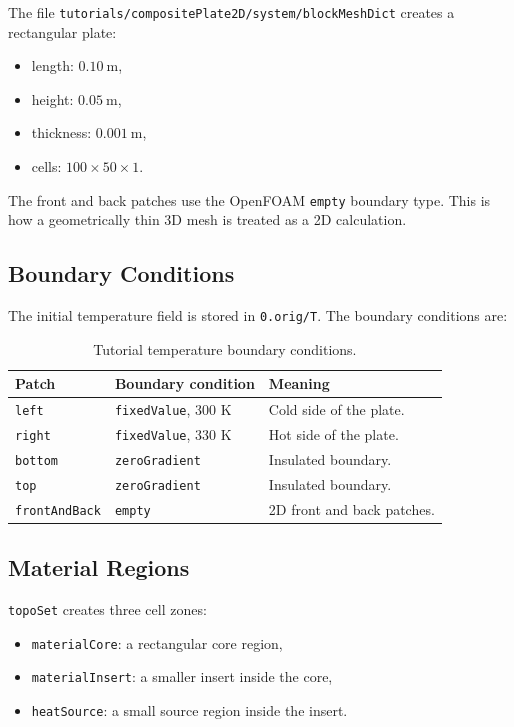 \documentclass[11pt,a4paper]{article}
\newcommand{\code}[1]{\texttt{#1}}
\begin{document}
The file \code{tutorials/compositePlate2D/system/blockMeshDict} creates a
rectangular plate:

\begin{itemize}
    \item length: $0.10~\mathrm{m}$,
    \item height: $0.05~\mathrm{m}$,
    \item thickness: $0.001~\mathrm{m}$,
    \item cells: $100 \times 50 \times 1$.
\end{itemize}

The front and back patches use the OpenFOAM \code{empty} boundary type. This is
how a geometrically thin 3D mesh is treated as a 2D calculation.

\subsection{Boundary Conditions}

The initial temperature field is stored in \code{0.orig/T}. The boundary
conditions are:

\begin{table}[h]
\centering
\begin{tabularx}{\textwidth}{l l Y}
\toprule
Patch & Boundary condition & Meaning \\
\midrule
\code{left} & \code{fixedValue}, 300 K & Cold side of the plate. \\
\code{right} & \code{fixedValue}, 330 K & Hot side of the plate. \\
\code{bottom} & \code{zeroGradient} & Insulated boundary. \\
\code{top} & \code{zeroGradient} & Insulated boundary. \\
\code{frontAndBack} & \code{empty} & 2D front and back patches. \\
\bottomrule
\end{tabularx}
\caption{Tutorial temperature boundary conditions.}
\label{tab:boundary-conditions}
\end{table}

\subsection{Material Regions}

\code{topoSet} creates three cell zones:

\begin{itemize}
    \item \code{materialCore}: a rectangular core region,
    \item \code{materialInsert}: a smaller insert inside the core,
    \item \code{heatSource}: a small source region inside the insert.
\end{itemize}
\end{document}
